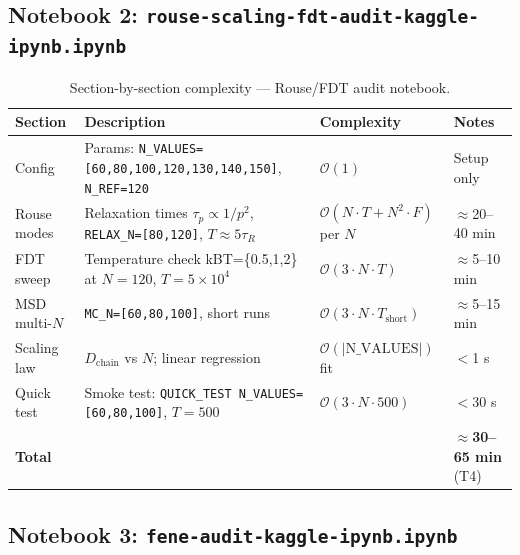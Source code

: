 \documentclass[12pt,a4paper]{article}
\newcommand{\Obig}[1]{\mathcal{O}\!\left(#1\right)}
\newcommand{\code}[1]{\texttt{#1}}
\begin{document}
\subsection{Notebook 2: \texttt{rouse-scaling-fdt-audit-kaggle-ipynb.ipynb}}

\begin{table}[h]
\centering
\caption{Section-by-section complexity — Rouse/FDT audit notebook.}
\label{tab:nb2}
\begin{tabular}{p{1.2cm}p{4.5cm}p{3cm}p{4cm}}
\toprule
Section & Description & Complexity & Notes \\
\midrule
Config  & Params: \code{N\_VALUES=[60,80,100,120,130,140,150]}, \code{N\_REF=120}
         & $\Obig{1}$ & Setup only \\
Rouse modes & Relaxation times $\tau_p \propto 1/p^2$, \code{RELAX\_N=[80,120]},
              $T\approx 5\tau_R$
         & $\Obig{N\cdot T + N^2\cdot F}$ per $N$
         & $\approx$20--40 min \\
FDT sweep  & Temperature check kBT=\{0.5,1,2\} at $N=120$, $T=5\times10^4$
           & $\Obig{3\cdot N\cdot T}$
           & $\approx$5--10 min \\
MSD multi-$N$ & \code{MC\_N=[60,80,100]}, short runs
              & $\Obig{3\cdot N\cdot T_\text{short}}$
              & $\approx$5--15 min \\
Scaling law & $D_\text{chain}$ vs $N$; linear regression
            & $\Obig{|\text{N\_VALUES}|}$ fit
            & $<$1 s \\
Quick test  & Smoke test: \code{QUICK\_TEST N\_VALUES=[60,80,100]}, $T=500$
            & $\Obig{3\cdot N\cdot 500}$
            & $<$30 s \\
\midrule
\textbf{Total} & & & $\approx$\textbf{30--65 min} (T4) \\
\bottomrule
\end{tabular}
\end{table}

\subsection{Notebook 3: \texttt{fene-audit-kaggle-ipynb.ipynb}}
\end{document}
